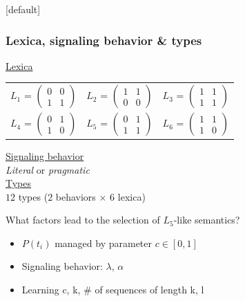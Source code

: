 \documentclass{beamer} %
\makeatletter
\newenvironment{withoutheadline}{
        \setbeamertemplate{headline}[default]
        \def\beamer@entrycode{\vspace*{-\headheight}}
    }{}
\makeatother
\begin{document}
\begin{withoutheadline}
\begin{frame}
	\frametitle{Lexica, signaling behavior \& types}
\underline{Lexica}
\begin{table}
\centering 
\begin{tabular}{l c l}
$L_1$ = $\begin{pmatrix} 0 & 0 \\ 1 & 1 \end{pmatrix}$ & 
$L_2$ = $\begin{pmatrix} 1 & 1 \\ 0 & 0 \end{pmatrix}$ & 
$L_3$ = $\begin{pmatrix} 1 & 1 \\ 1 & 1 \end{pmatrix}$\\[1cm]

$L_4$ = $\begin{pmatrix} 0 & 1 \\ 1 & 0 \end{pmatrix}$ &
$L_5$ = $\begin{pmatrix} 0 & 1 \\ 1 & 1 \end{pmatrix}$ &
$L_6$ = $\begin{pmatrix} 1 & 1 \\ 1 & 0 \end{pmatrix}$
\end{tabular}
\end{table}
\underline{Signaling behavior}\\ {\em Literal} or {\em pragmatic}\\[0.75cm]
\underline{Types}\\ $12$ types ($2$ behaviors $\times$ $6$ lexica)
\end{frame}

\begin{frame} 
\begin{center}What factors lead to the selection of $L_5$-like semantics?\end{center}
\end{frame}

\begin{frame}
\begin{itemize}\itemsep1em
\item $P(t_i)$ managed by parameter $c \in [0,1]$ 
\item Signaling behavior: \alert{$\lambda$}, $\alpha$
\item Learning \alert{c, k}, \# of sequences of length k, \alert{l}
\end{itemize}
\end{frame}


\end{withoutheadline}
\end{document}
